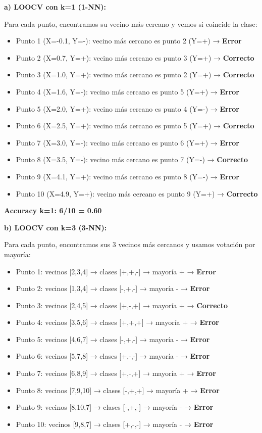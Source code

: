 \documentclass[12pt]{article}
\begin{document}
\textbf{a) LOOCV con k=1 (1-NN):}

Para cada punto, encontramos su vecino más cercano y vemos si coincide la clase:

\begin{itemize}
    \item Punto 1 (X=-0.1, Y=-): vecino más cercano es punto 2 (Y=+) → \textbf{Error}
    \item Punto 2 (X=0.7, Y=+): vecino más cercano es punto 3 (Y=+) → \textbf{Correcto}  
    \item Punto 3 (X=1.0, Y=+): vecino más cercano es punto 2 (Y=+) → \textbf{Correcto}
    \item Punto 4 (X=1.6, Y=-): vecino más cercano es punto 5 (Y=+) → \textbf{Error}
    \item Punto 5 (X=2.0, Y=+): vecino más cercano es punto 4 (Y=-) → \textbf{Error}
    \item Punto 6 (X=2.5, Y=+): vecino más cercano es punto 5 (Y=+) → \textbf{Correcto}
    \item Punto 7 (X=3.0, Y=-): vecino más cercano es punto 6 (Y=+) → \textbf{Error}
    \item Punto 8 (X=3.5, Y=-): vecino más cercano es punto 7 (Y=-) → \textbf{Correcto}
    \item Punto 9 (X=4.1, Y=+): vecino más cercano es punto 8 (Y=-) → \textbf{Error}
    \item Punto 10 (X=4.9, Y=+): vecino más cercano es punto 9 (Y=+) → \textbf{Correcto}
\end{itemize}

\textbf{Accuracy k=1: 6/10 = 0.60}

\vspace{1em}

\textbf{b) LOOCV con k=3 (3-NN):}

Para cada punto, encontramos sus 3 vecinos más cercanos y usamos votación por mayoría:

\begin{itemize}
    \item Punto 1: vecinos [2,3,4] → clases [+,+,-] → mayoría + → \textbf{Error}
    \item Punto 2: vecinos [1,3,4] → clases [-,+,-] → mayoría - → \textbf{Error}
    \item Punto 3: vecinos [2,4,5] → clases [+,-,+] → mayoría + → \textbf{Correcto}
    \item Punto 4: vecinos [3,5,6] → clases [+,+,+] → mayoría + → \textbf{Error}
    \item Punto 5: vecinos [4,6,7] → clases [-,+,-] → mayoría - → \textbf{Error}
    \item Punto 6: vecinos [5,7,8] → clases [+,-,-] → mayoría - → \textbf{Error}
    \item Punto 7: vecinos [6,8,9] → clases [+,-,+] → mayoría + → \textbf{Error}
    \item Punto 8: vecinos [7,9,10] → clases [-,+,+] → mayoría + → \textbf{Error}
    \item Punto 9: vecinos [8,10,7] → clases [-,+,-] → mayoría - → \textbf{Error}
    \item Punto 10: vecinos [9,8,7] → clases [+,-,-] → mayoría - → \textbf{Error}
\end{itemize}
\end{document}
